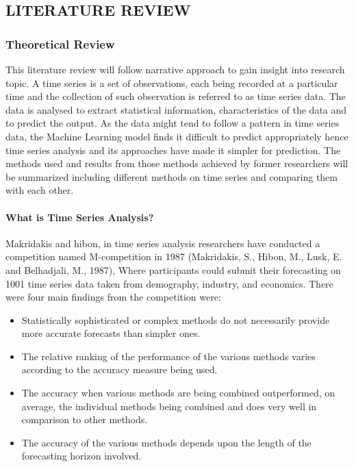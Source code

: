 \documentclass[
  letterpaper,
  DIV=11,
  numbers=noendperiod]{scrartcl}
\let\oldparagraph\paragraph
\renewcommand{\paragraph}[1]{\oldparagraph{#1}\mbox{}}
\begin{document}
\hypertarget{literature-review}{%
\subsection{LITERATURE REVIEW}\label{literature-review}}

\hypertarget{theoretical-review}{%
\subsubsection{Theoretical Review}\label{theoretical-review}}

This literature review will follow narrative approach to gain insight
into research topic. A time series is a set of observations, each being
recorded at a particular time and the collection of such observation is
referred to as time series data. The data is analysed to extract
statistical information, characteristics of the data and to predict the
output. As the data might tend to follow a pattern in time series data,
the Machine Learning model finds it difficult to predict appropriately
hence time series analysis and its approaches have made it simpler for
prediction. The methods used and results from those methods achieved by
former researchers will be summarized including different methods on
time series and comparing them with each other.

\hypertarget{what-is-time-series-analysis}{%
\paragraph{What is Time Series
Analysis?}\label{what-is-time-series-analysis}}

Makridakis and hibon, in time series analysis researchers have conducted
a competition named M-competition in 1987 (Makridakis, S., Hibon, M.,
Lusk, E. and Belhadjali, M., 1987), Where participants could submit
their forecasting on 1001 time series data taken from demography,
industry, and economics. There were four main findings from the
competition were:

\begin{itemize}
\item
  Statistically sophisticated or complex methods do not necessarily
  provide more accurate forecasts than simpler ones.
\item
  The relative ranking of the performance of the various methods varies
  according to the accuracy measure being used.
\item
  The accuracy when various methods are being combined outperformed, on
  average, the individual methods being combined and does very well in
  comparison to other methods.
\item
  The accuracy of the various methods depends upon the length of the
  forecasting horizon involved.
\end{itemize}
\end{document}
